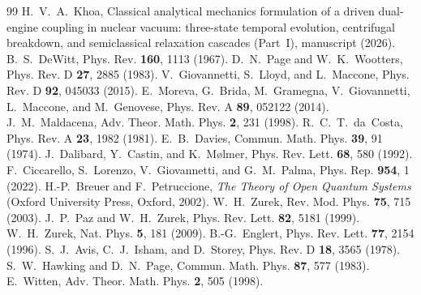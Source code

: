 \documentclass[aps,prc,twocolumn,superscriptaddress,amsmath,amssymb,nofootinbib]{revtex4-2}
\begin{document}
\begin{thebibliography}{99}
 H.~V.~A.~Khoa, Classical analytical mechanics formulation of a driven dual-engine coupling in nuclear vacuum: three-state temporal evolution, centrifugal breakdown, and semiclassical relaxation cascades (Part~I), manuscript (2026).
 B.~S.~DeWitt, Phys. Rev. \textbf{160}, 1113 (1967).
 D.~N.~Page and W.~K.~Wootters, Phys. Rev. D \textbf{27}, 2885 (1983).
 V.~Giovannetti, S.~Lloyd, and L.~Maccone, Phys. Rev. D \textbf{92}, 045033 (2015).
 E.~Moreva, G.~Brida, M.~Gramegna, V.~Giovannetti, L.~Maccone, and M.~Genovese, Phys. Rev. A \textbf{89}, 052122 (2014).
 J.~M.~Maldacena, Adv. Theor. Math. Phys. \textbf{2}, 231 (1998).
 R.~C.~T.~da~Costa, Phys. Rev. A \textbf{23}, 1982 (1981).
 E.~B.~Davies, Commun. Math. Phys. \textbf{39}, 91 (1974).
 J.~Dalibard, Y.~Castin, and K.~M{\o}lmer, Phys. Rev. Lett. \textbf{68}, 580 (1992).
 F.~Ciccarello, S.~Lorenzo, V.~Giovannetti, and G.~M.~Palma, Phys. Rep. \textbf{954}, 1 (2022).
 H.-P.~Breuer and F.~Petruccione, \emph{The Theory of Open Quantum Systems} (Oxford University Press, Oxford, 2002).
 W.~H.~Zurek, Rev. Mod. Phys. \textbf{75}, 715 (2003).
 J.~P.~Paz and W.~H.~Zurek, Phys. Rev. Lett. \textbf{82}, 5181 (1999).
 W.~H.~Zurek, Nat. Phys. \textbf{5}, 181 (2009).
 B.-G.~Englert, Phys. Rev. Lett. \textbf{77}, 2154 (1996).
 S.~J.~Avis, C.~J.~Isham, and D.~Storey, Phys. Rev. D \textbf{18}, 3565 (1978).
 S.~W.~Hawking and D.~N.~Page, Commun. Math. Phys. \textbf{87}, 577 (1983).
 E.~Witten, Adv. Theor. Math. Phys. \textbf{2}, 505 (1998).
\end{thebibliography}
\end{document}
